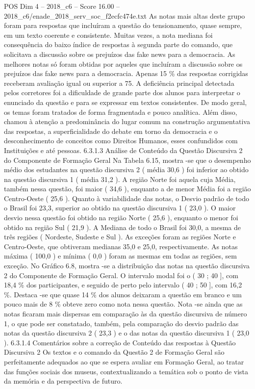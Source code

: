 \begin{textsample}{POS Dim 4 – 2018\_c6 – Score 16.00 – 2018\_c6/enade\_2018\_serv\_soc\_f2ecfc474e.txt}
As notas mais altas deste grupo foram para respostas que incluíram a questão do tensionamento, quase sempre, em um texto coerente e consistente.
Muitas vezes, a nota mediana foi consequência do baixo índice de respostas à segunda parte do comando, que solicitava a discussão sobre os prejuízos das fake news para a democracia.
As melhores notas só foram obtidas por aqueles que incluíram a discussão sobre os prejuízos das fake news para a democracia.
Apenas 15 \% das respostas corrigidas receberam avaliação igual ou superior a 75.
A deficiência principal detectada pelos corretores foi a dificuldade de grande parte dos alunos para interpretar o enunciado da questão e para se expressar em textos consistentes.
De modo geral, os temas foram tratados de forma fragmentada e pouco analítica.
Além disso, chamou à atenção a predominância do lugar comum na construção argumentativa das respostas, a superficialidade do debate em torno da democracia e o desconhecimento de conceitos como Direitos Humanos, esses confundidos com Instituições e até pessoas. 6.3.1.3 Análise de Conteúdo da Questão Discursiva 2 do Componente de Formação Geral Na Tabela 6.15, mostra -se que o desempenho médio dos estudantes na questão discursiva 2 ( média 30,6 ) foi inferior ao obtido na questão discursiva 1 ( média 31,2 ).
A região Norte foi aquela cuja Média, também nessa questão, foi maior ( 34,6 ), enquanto a de menor Média foi a região Centro-Oeste ( 25,6 ).
Quanto à variabilidade das notas, o Desvio padrão de todo o Brasil foi 23,3, superior ao obtido na questão discursiva 1 ( 23,0 ).
O maior desvio nessa questão foi obtido na região Norte ( 25,6 ), enquanto o menor foi obtido na região Sul ( 21,9 ).
A Mediana de todo o Brasil foi 30,0, a mesma de três regiões ( Nordeste, Sudeste e Sul ).
As exceções foram as regiões Norte e Centro-Oeste, que obtiveram medianas 35,0 e 25,0, respectivamente.
As notas máxima ( 100,0 ) e mínima ( 0,0 ) foram as mesmas em todas as regiões, sem exceção.
No Gráfico 6.8, mostra -se a distribuição das notas na questão discursiva 2 do Componente de Formação Geral.
O intervalo modal foi o ( 30 ; 40 ], com 18,4 \% dos participantes, e seguido de perto pelo intervalo ( 40 ; 50 ], com 16,2 \%.
Destaca -se que quase 14 \% dos alunos deixaram a questão em branco e um pouco mais de 8 \% obteve zero como nota nessa questão.
Nota -se ainda que as notas ficaram mais dispersas em comparação às da questão discursiva de número 1, o que pode ser constatado, também, pela comparação do desvio padrão das notas da questão discursiva 2 ( 23,3 ) e o das notas da questão discursiva 1 ( 23,0 ). 6.3.1.4 Comentários sobre a correção de Conteúdo das respostas à Questão Discursiva 2 Os textos e o comando da Questão 2 de Formação Geral são perfeitamente adequados ao que se espera avaliar em Formação Geral, ao tratar das funções sociais dos museus, contextualizando a temática sob o ponto de vista da memória e da perspectiva de futuro.

\end{textsample}

